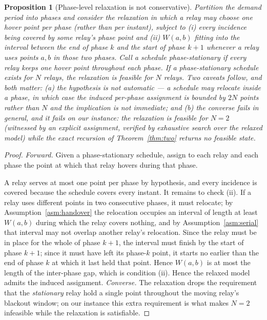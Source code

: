 \documentclass[11pt]{article}
\theoremstyle{dshplain}
\newtheorem{proposition}[theorem]{Proposition}
\theoremstyle{dshdefn}
\begin{document}
\begin{proposition}[Phase-level relaxation is not conservative]
\label{prop:phase}
Partition the demand period into phases and consider the relaxation in which a
relay may choose one hover point \emph{per phase} (rather than per instant),
subject to (i) every incidence being covered by some relay's phase point and
(ii) $W(a,b)$ fitting into the interval between the end of phase $k$ and the
start of phase $k+1$ whenever a relay uses points $a,b$ in those two phases.
Call a schedule \emph{phase-stationary} if every relay keeps one hover point
throughout each phase. If a phase-stationary schedule exists for $N$ relays, the
relaxation is feasible for $N$ relays. Two caveats follow, and both matter:
(a) the hypothesis is not automatic --- a schedule may relocate \emph{inside} a
phase, in which case the induced per-phase assignment is bounded by
$2N$ points rather than $N$ and the implication is not immediate; and
(b) the converse fails in general, and it fails on our instance: the relaxation is
feasible for $N=2$ (witnessed by an explicit assignment, verified by exhaustive
search over the relaxed model) while the exact recursion of
Theorem~\ref{thm:two} returns no feasible state.
\end{proposition}
\begin{proof}
{\sloppy\emph{Forward.} Given a phase-stationary schedule, assign to each relay
and each phase the point at which that relay hovers during that phase.}\par A relay serves at
most one point per phase by hypothesis, and every incidence is covered because the
schedule covers every instant. It remains to check (ii). If a relay uses different
points in two consecutive phases, it must relocate; by
Assumption~\ref{asm:handover} the relocation occupies an interval of length at
least $W(a,b)$ during which the relay covers nothing, and by
Assumption~\ref{asm:serial} that interval may not overlap another relay's
relocation. Since the relay must be in place for the whole of phase $k+1$, the
interval must finish by the start of phase $k+1$; since it must have left its
phase-$k$ point, it starts no earlier than the end of phase $k$ at which it last
held that point. Hence $W(a,b)$ is at most the length of the inter-phase gap, which
is condition (ii). Hence the relaxed model admits the induced assignment.
{\sloppy\emph{Converse.} The relaxation drops the requirement that the
\emph{stationary} relay hold a single point throughout the moving relay's
blackout window; on our instance this extra requirement is what makes $N=2$
infeasible while the relaxation is satisfiable.}\par
\end{proof}
\end{document}
